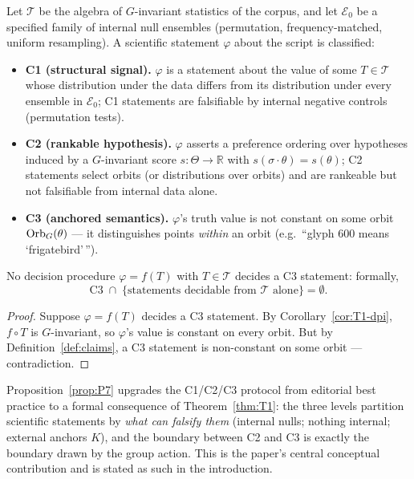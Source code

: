 \begin{definition}
\label{def:claims}
Let $\mathcal{T}$ be the algebra of $G$-invariant statistics of the
corpus, and let $\mathcal{E}_0$ be a specified family of internal
null ensembles (permutation, frequency-matched, uniform resampling).
A scientific statement $\varphi$ about the script is classified:
\begin{itemize}[nosep]
\item \textbf{C1 (structural signal).} $\varphi$ is a statement about
the value of some $T\in\mathcal{T}$ whose distribution under the data
differs from its distribution under every ensemble in
$\mathcal{E}_0$; C1 statements are falsifiable by internal negative
controls (permutation tests).
\item \textbf{C2 (rankable hypothesis).} $\varphi$ asserts a
preference ordering over hypotheses induced by a $G$-invariant score
$s:\Theta\to\mathbb{R}$ with $s(\sigma\cdot\theta)=s(\theta)$; C2
statements select orbits (or distributions over orbits) and are
rankeable but not falsifiable from internal data alone.
\item \textbf{C3 (anchored semantics).} $\varphi$'s truth value is
not constant on some orbit $\mathrm{Orb}_G(\theta)$ --- it distinguishes
points \emph{within} an orbit (e.g.\ ``glyph 600 means
`frigatebird'\,'').
\end{itemize}
\end{definition}

\begin{proposition}
\label{prop:P7}
No decision procedure $\varphi=f(T)$ with $T\in\mathcal{T}$ decides a
C3 statement: formally,
\[
\text{C3}\;\cap\;
\{\text{statements decidable from } \mathcal{T}\text{ alone}\}
=\emptyset .
\]
\end{proposition}

\begin{proof}
Suppose $\varphi=f(T)$ decides a C3 statement. By
Corollary~\ref{cor:T1-dpi}, $f\circ T$ is $G$-invariant, so
$\varphi$'s value is constant on every orbit. But by
Definition~\ref{def:claims}, a C3 statement is non-constant on some
orbit --- contradiction.
\end{proof}

\begin{remark}
Proposition~\ref{prop:P7} upgrades the C1/C2/C3 protocol from
editorial best practice to a formal consequence of
Theorem~\ref{thm:T1}: the three levels partition scientific
statements by \emph{what can falsify them} (internal nulls; nothing
internal; external anchors $K$), and the boundary between C2 and C3
is exactly the boundary drawn by the group action. This is the
paper's central conceptual contribution and is stated as such in the
introduction.
\end{remark}
